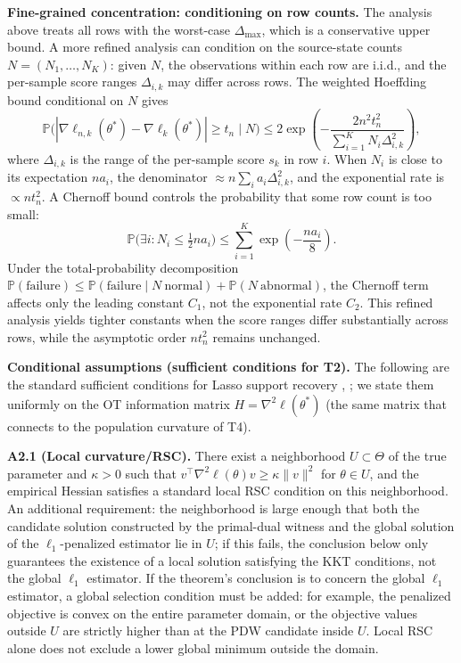 \documentclass[11pt,a4paper]{article}
\theoremstyle{remark}
\begin{document}
\textbf{Fine-grained concentration: conditioning on row counts.} The analysis above treats
all rows with the worst-case $\Delta_{\max}$, which is a conservative upper bound. A more
refined analysis can condition on the source-state counts $N=(N_1,\dots,N_K)$: given $N$,
the observations within each row are i.i.d., and the per-sample score ranges $\Delta_{i,k}$
may differ across rows. The weighted Hoeffding bound conditional on $N$ gives
\[
\mathbb{P}\bigl(|\nabla\ell_{n,k}(\theta^*)-\nabla\ell_k(\theta^*)|\ge t_n\mid N\bigr)
\le 2\exp\!\left(-\frac{2n^2 t_n^2}{\sum_{i=1}^{K}N_i\Delta_{i,k}^2}\right),
\]
where $\Delta_{i,k}$ is the range of the per-sample score $s_k$ in row $i$. When $N_i$ is
close to its expectation $n a_i$, the denominator $\approx n\sum_i a_i\Delta_{i,k}^2$, and
the exponential rate is $\propto n t_n^2$. A Chernoff bound controls the probability that
some row count is too small:
\[
\mathbb{P}\bigl(\exists i:N_i\le\tfrac12 n a_i\bigr)\le\sum_{i=1}^{K}\exp\!\left(-\frac{n a_i}{8}\right).
\]
Under the total-probability decomposition $\mathbb{P}(\text{failure})\le
\mathbb{P}(\text{failure}\mid N\ \text{normal})+\mathbb{P}(N\ \text{abnormal})$, the
Chernoff term affects only the leading constant $C_1$, not the exponential rate $C_2$. This
refined analysis yields tighter constants when the score ranges differ substantially across
rows, while the asymptotic order $n t_n^2$ remains unchanged.

\textbf{Conditional assumptions (sufficient conditions for T2).} The following are the
standard sufficient conditions for Lasso support recovery \cite{zhao2006lasso},
\cite{wainwright2009sharp}; we state them uniformly on the OT information matrix
$H=\nabla^2\ell(\theta^*)$ (the same matrix that connects to the population curvature of
T4).

\textbf{A2.1 (Local curvature/RSC).} There exist a neighborhood $U\subset\Theta$ of the
true parameter and $\kappa>0$ such that
$v^{\top}\nabla^2\ell(\theta)v\ge\kappa\|v\|^2$ for $\theta\in U$, and the empirical
Hessian satisfies a standard local RSC condition on this neighborhood. An additional
requirement: the neighborhood is large enough that both the candidate solution constructed
by the primal-dual witness and the global solution of the $\ell_1$-penalized estimator lie
in $U$; if this fails, the conclusion below only guarantees the existence of a local
solution satisfying the KKT conditions, not the global $\ell_1$ estimator.
If the theorem's conclusion is to concern the global $\ell_1$ estimator, a global selection
condition must be added: for example, the penalized objective is convex on the entire
parameter domain, or the objective values outside $U$ are strictly higher than at the PDW
candidate inside $U$. Local RSC alone does not exclude a lower global minimum outside the
domain.
\end{document}
